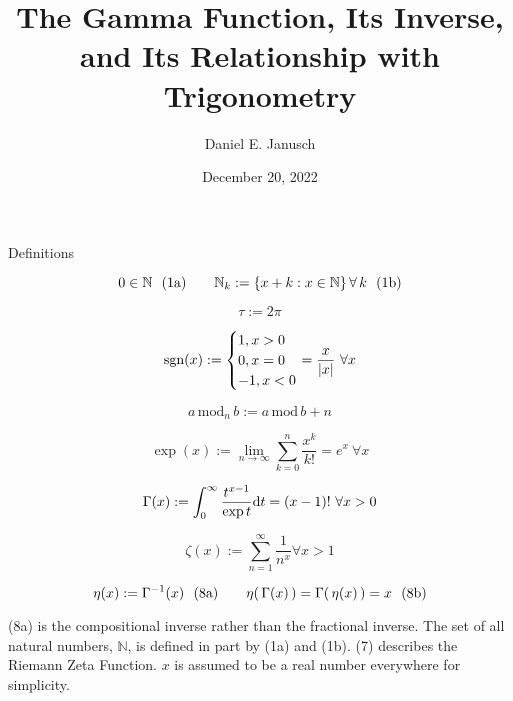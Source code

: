 \documentclass[12pt]{article}
\begin{document}
\title{The Gamma Function, Its Inverse, and Its Relationship with Trigonometry}
\author{Daniel E. Janusch}
\date{December 20, 2022} %
\maketitle

\begin{section}{Definitions}

	\begin{equation}
		0\in\mathbb N~~(1\text a)\hspace{2em}\mathbb N_k:=\left\{x+k:x\in\mathbb N\right\}\forall\,k~~(1\text b)
	\end{equation}

	\vspace{-0.065em}\begin{equation}
		\tau:=2\pi
	\end{equation}

	\vspace{-0.065em}\begin{equation}
		\text{sgn}(x):=\begin{cases}
			1,x>0\\
			0,x=0\\
			-1,x<0
		\end{cases}\hspace{-1em}=\dfrac x{|x|}~\forall x
	\end{equation}

	\vspace{-0.065em}\begin{equation}
		a\,\text{mod}_n\,b:=a\,\text{mod}\,b+n
	\end{equation}

	\vspace{-0.065em}\begin{equation}
		\exp(x):=\lim_{n\to\infty}\sum_{k=0}^n\dfrac{x^k}{k!}=e^x~\forall x
	\end{equation}

	\vspace{-0.065em}\begin{equation}
		\Gamma(x):=\int_0^\infty\dfrac{t^{x-1}}{\exp t}\text dt=(x-1)!~\forall x>0
	\end{equation}

	\vspace{-0.065em}\begin{equation}
		\zeta(x):=\sum_{n=1}^\infty\dfrac1{n^x}\forall x>1
	\end{equation}

	\vspace{-0.065em}\begin{equation}
		\eta(x):=\Gamma^{-1}(x)~~(8\text a)\hspace{2em}\eta(\,\Gamma(x)\,)=\Gamma(\,\eta(x)\,)=x~~(8\text b)
	\end{equation}

	\noindent(8a) is the compositional inverse rather than the fractional inverse. The set of all natural numbers, $\mathbb N$, is defined in part by (1a) and (1b). (7) describes the Riemann Zeta Function. $x$ is assumed to be a real number everywhere for simplicity.
\end{section}
\end{document}
